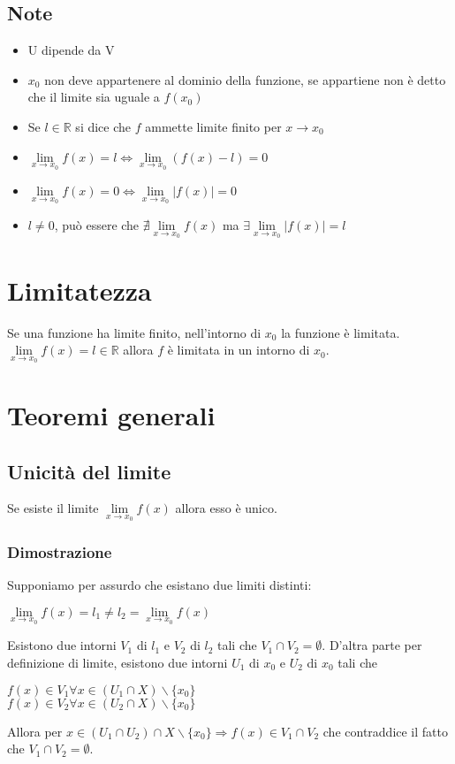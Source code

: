 \subsection{Note}
\begin{itemize}
\item U dipende da V
\item $x_0$ non deve appartenere al dominio della funzione, se appartiene non \`e detto che il limite sia uguale a $f(x_0)$
\item Se $l\in\mathbb{R}$ si dice che $f$ ammette limite finito per $x\rightarrow x_0$
\item $\lim\limits_{x\rightarrow x_0} f(x)=l\Leftrightarrow \lim\limits_{x\rightarrow x_0} (f(x)-l)=0$
\item $\lim\limits_{x\rightarrow x_0} f(x)=0 \Leftrightarrow\lim\limits_{x\rightarrow x_0} |f(x)|=0$
\item $l\neq 0$, pu\`o essere che $\nexists\lim\limits_{x\rightarrow x_0} f(x)$ ma $\exists \lim\limits_{x\rightarrow x_0} |f(x)|=l$
\end{itemize}
\section{Limitatezza}
Se una funzione ha limite finito, nell'intorno di $x_0$ la funzione \`e limitata.\\
$\lim\limits_{x\rightarrow x_0} f(x)=l\in\mathbb{R}$ allora $f$ \`e limitata in un intorno di $x_0$. 
\section{Teoremi generali}
\subsection{Unicit\`a del limite}
Se esiste il limite $\lim\limits_{x\rightarrow x_0} f(x)$ allora esso \`e unico.\\
\subsubsection{Dimostrazione}
Supponiamo per assurdo che esistano due limiti distinti:
\begin{center}
$\lim\limits_{x\rightarrow x_0} f(x)=l_1\neq l_2=\lim\limits_{x\rightarrow x_0} f(x)$
\end{center}
Esistono due intorni $V_1$ di $l_1$ e $V_2$ di $l_2$ tali che $V_1\cap V_2=\emptyset$. D'altra parte per definizione di limite, esistono due intorni $U_1$ di $x_0$ e $U_2$
di $x_0$  tali che 
\begin{center}
$f(x)\in V_1 \forall x\in (U_1\cap X)\backslash\{x_0\}$\\
$f(x)\in V_2 \forall x\in (U_2\cap X)\backslash\{x_0\}$
\end{center}
Allora per $x\in (U_1\cap U_2)\cap X\backslash\{x_0\}\Rightarrow f(x)\in V_1\cap V_2$ che contraddice il fatto che $V_1\cap V_2=\emptyset$.

